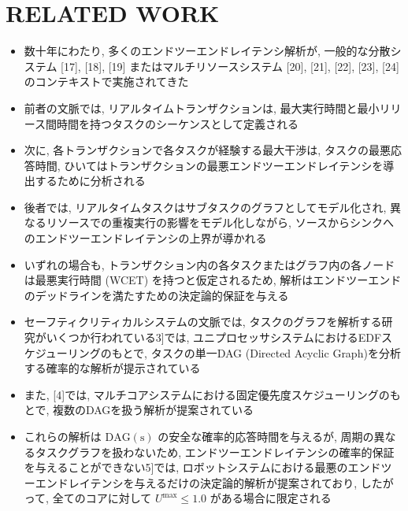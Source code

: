 
\section{RELATED WORK}
\label{sec: related work}

\begin{frame}{}
    \begin{itemize}
        \item 数十年にわたり, 多くのエンドツーエンドレイテンシ解析が, 一般的な分散システム [17], [18], [19] またはマルチリソースシステム [20], [21], [22], [23], [24] のコンテキストで実施されてきた
\item 前者の文脈では, リアルタイムトランザクションは, 最大実行時間と最小リリース間時間を持つタスクのシーケンスとして定義される
\item 次に, 各トランザクションで各タスクが経験する最大干渉は, タスクの最悪応答時間, ひいてはトランザクションの最悪エンドツーエンドレイテンシを導出するために分析される
\item 後者では, リアルタイムタスクはサブタスクのグラフとしてモデル化され, 異なるリソースでの重複実行の影響をモデル化しながら, ソースからシンクへのエンドツーエンドレイテンシの上界が導かれる
\item いずれの場合も, トランザクション内の各タスクまたはグラフ内の各ノードは最悪実行時間 (WCET) を持つと仮定されるため, 解析はエンドツーエンドのデッドラインを満たすための決定論的保証を与える
    \end{itemize}
\end{frame}

\begin{frame}{}
    \begin{itemize}
        \item セーフティクリティカルシステムの文脈では, タスクのグラフを解析する研究がいくつか行われている3]では, ユニプロセッサシステムにおけるEDFスケジューリングのもとで, タスクの単一DAG (Directed Acyclic Graph)を分析する確率的な解析が提示されている
\item また, [4]では, マルチコアシステムにおける固定優先度スケジューリングのもとで, 複数のDAGを扱う解析が提案されている
\item これらの解析は $\mathrm{DAG}(\mathrm{s})$ の安全な確率的応答時間を与えるが, 周期の異なるタスクグラフを扱わないため, エンドツーエンドレイテンシの確率的保証を与えることができない5]では, ロボットシステムにおける最悪のエンドツーエンドレイテンシを与えるだけの決定論的解析が提案されており, したがって, 全てのコアに対して $U^{\max } \leq 1.0$ がある場合に限定される
    \end{itemize}
\end{frame}

